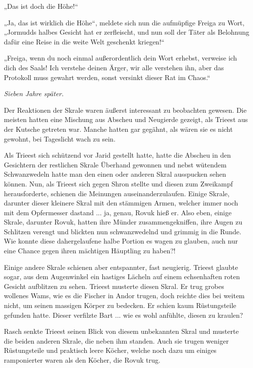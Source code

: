 „Das ist doch die Höhe!“

„Ja, das ist wirklich die Höhe“, meldete sich nun die aufmüpfige Freiga zu Wort, „Jormudds halbes Gesicht hat er zerfleischt, und nun soll der Täter als Belohnung dafür eine Reise in die weite Welt geschenkt kriegen!“

„Freiga, wenn du noch einmal außerordentlich dein Wort erhebst, verweise ich dich des Saals! Ich verstehe deinen Ärger, wir alle verstehen ihn, aber das Protokoll muss gewahrt werden, sonst versinkt dieser Rat im Chaos.“\bigskip








\textit{Sieben Jahre später.}\bigskip




Der Reaktionen der Skrale waren äußerst interessant zu beobachten gewesen. Die meisten hatten eine Mischung aus Abscheu und Neugierde gezeigt, als Trieest aus der Kutsche getreten war. Manche hatten gar gegähnt, als wären sie es nicht gewohnt, bei Tageslicht wach zu sein.

Als Trieest sich schützend vor Jarid gestellt hatte, hatte die Abscheu in den Gesichtern der restlichen Skrale Überhand gewonnen und nebst wütendem Schwanzwedeln hatte man den einen oder anderen Skral ausspucken sehen können. Nun, als Trieest sich gegen Shron stellte und diesen zum Zweikampf herausforderte, schienen die Meinungen auseinanderzulaufen. Einige Skrale, darunter dieser kleinere Skral mit den stämmigen Armen, welcher immer noch mit dem Opfermesser dastand ... ja, genau, Rovuk hieß er. Also eben, einige Skrale, darunter Rovuk, hatten ihre Münder zusammengekniffen, ihre Augen zu Schlitzen verengt und blickten nun schwanzwedelnd und grimmig in die Runde. Wie konnte diese dahergelaufene halbe Portion es wagen zu glauben, auch nur eine Chance gegen ihren mächtigen Häuptling zu haben?!

Einige andere Skrale schienen aber entspannter, fast neugierig. Trieest glaubte sogar, aus dem Augenwinkel ein hastiges Lächeln auf einem echsenhaften roten Gesicht aufblitzen zu sehen. Trieest musterte diesen Skral. Er trug grobes wollenes Wams, wie es die Fischer in Andor trugen, doch reichte dies bei weitem nicht, um seinen massigen Körper zu bedecken. Er schien kaum Rüstungsteile gefunden hatte. Dieser verfilzte Bart ... wie es wohl anfühlte, diesen zu kraulen?

Rasch senkte Trieest seinen Blick von diesem unbekannten Skral und musterte die beiden anderen Skrale, die neben ihm standen. Auch sie trugen weniger Rüstungsteile und praktisch leere Köcher, welche noch dazu um einiges ramponierter waren als den Köcher, die Rovuk trug.

